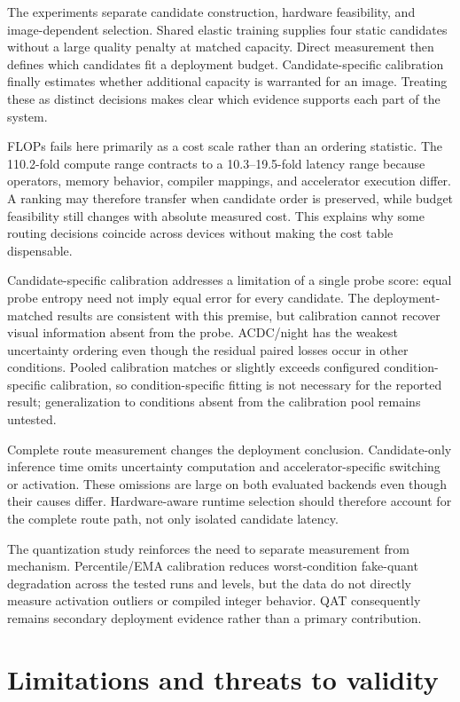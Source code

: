 \documentclass[a4paper,review,12pt]{elsarticle}
\begin{document}
The experiments separate candidate construction, hardware feasibility, and image-dependent selection. Shared elastic training supplies four static candidates without a large quality penalty at matched capacity. Direct measurement then defines which candidates fit a deployment budget. Candidate-specific calibration finally estimates whether additional capacity is warranted for an image. Treating these as distinct decisions makes clear which evidence supports each part of the system.

FLOPs fails here primarily as a cost scale rather than an ordering statistic. The 110.2-fold compute range contracts to a 10.3--19.5-fold latency range because operators, memory behavior, compiler mappings, and accelerator execution differ. A ranking may therefore transfer when candidate order is preserved, while budget feasibility still changes with absolute measured cost. This explains why some routing decisions coincide across devices without making the cost table dispensable.

Candidate-specific calibration addresses a limitation of a single probe score: equal probe entropy need not imply equal error for every candidate. The deployment-matched results are consistent with this premise, but calibration cannot recover visual information absent from the probe. ACDC/night has the weakest uncertainty ordering even though the residual paired losses occur in other conditions. Pooled calibration matches or slightly exceeds configured condition-specific calibration, so condition-specific fitting is not necessary for the reported result; generalization to conditions absent from the calibration pool remains untested.

Complete route measurement changes the deployment conclusion. Candidate-only inference time omits uncertainty computation and accelerator-specific switching or activation. These omissions are large on both evaluated backends even though their causes differ. Hardware-aware runtime selection should therefore account for the complete route path, not only isolated candidate latency.

The quantization study reinforces the need to separate measurement from mechanism. Percentile/EMA calibration reduces worst-condition fake-quant degradation across the tested runs and levels, but the data do not directly measure activation outliers or compiled integer behavior. QAT consequently remains secondary deployment evidence rather than a primary contribution.

\section{Limitations and threats to validity}
\label{sec:limitations}
\end{document}
